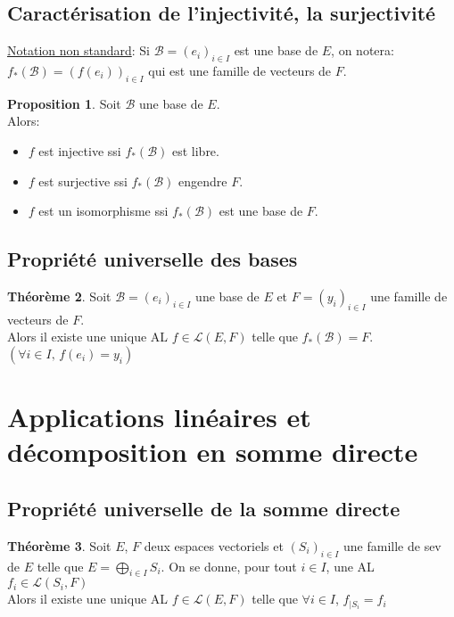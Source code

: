 \documentclass[10pt,a4paper]{article}
\theoremstyle{definition}
\newtheorem{proposition}{Proposition}[section]
\newtheorem{theorem}[proposition]{Théorème}
\begin{document}
\subsection{Caractérisation de l'injectivité, la surjectivité}
\noindent \uline{Notation non standard}: Si $\mathcal{B} = (e_i)_{i \in I}$ est une base de $E$, on notera: \\
$f_*(\mathcal{B}) = (f(e_i))_{i \in I}$ qui est une famille de vecteurs de $F$.
\begin{proposition}
Soit $\mathcal{B}$ une base de $E$. \\
Alors:
\begin{itemize}
\item $f$ est injective ssi $f_*(\mathcal{B})$ est libre.
\item $f$ est surjective ssi $f_*(\mathcal{B})$ engendre $F$.
\item $f$ est un isomorphisme ssi $f_*(\mathcal{B})$ est une base de $F$.
\end{itemize}
\end{proposition}

\subsection{Propriété universelle des bases}
\begin{theorem}
Soit $\mathcal{B} = (e_i)_{i \in I}$ une base de $E$ et $F = (y_i)_{i \in I}$ une famille de vecteurs de $F$. \\
Alors il existe une unique AL $f \in \mathcal{L}(E, F)$ telle que $f_*(\mathcal{B}) = F$. $(\forall i \in I,\, f(e_i) = y_i)$
\end{theorem}

\section{Applications linéaires et décomposition en somme directe}
\subsection{Propriété universelle de la somme directe}
\begin{theorem}
Soit $E$, $F$ deux espaces vectoriels et $(S_i)_{i \in I}$ une famille de sev de $E$ telle que $E = \bigoplus\limits_{i \in I} S_i$. On se donne, pour tout $i \in I$, une AL $f_i \in \mathcal{L}(S_i, F)$ \\
Alors il existe une unique AL $f \in \mathcal{L}(E, F)$ telle que $\forall i \in I$, $f_{|S_i} = f_i$
\end{theorem}
\end{document}
